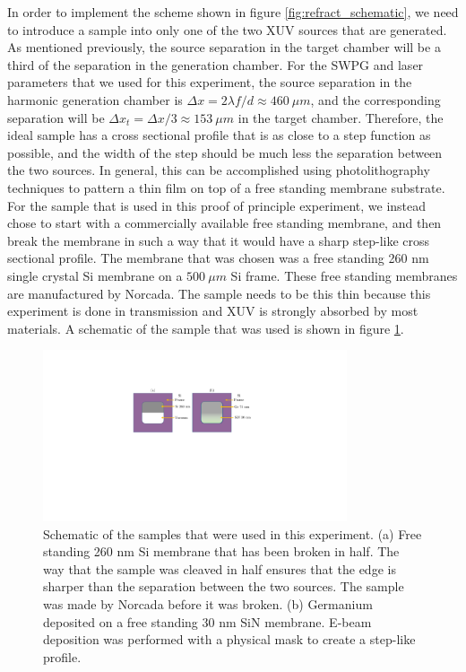 In order to implement the scheme shown in figure \ref{fig:refract_schematic}, we need to introduce a sample into only one of the two XUV sources that are generated.  As mentioned previously, the source separation in the target chamber will be a third of the separation in the generation chamber. For the SWPG and laser parameters that we used for this experiment, the source separation in the harmonic generation chamber is $\Delta x=2\lambda f/d\approx460\:\mu m$, and the corresponding separation will be $\Delta x_t = \Delta x/3\approx153\: \mu m$ in the target chamber.  Therefore, the ideal sample has a cross sectional profile that is as close to a step function as possible, and the width of the step should be much less the separation between the two sources.  In general, this can be accomplished using photolithography techniques to pattern a thin film on top of a free standing membrane substrate.  For the sample that is used in this proof of principle experiment, we instead chose to start with a commercially available free standing membrane, and then break the membrane in such a way that it would have a sharp step-like cross sectional profile.  The membrane that was chosen was a free standing 260 nm single crystal Si membrane on a $500\:\mu m$ Si frame.  These free standing membranes are manufactured by Norcada.  The sample needs to be this thin because this experiment is done in transmission and XUV is strongly absorbed by most materials. A schematic of the sample that was used is shown in figure \ref{fig:split_sample}.
\begin{figure}
	\centering
	\includegraphics[width=0.8\textwidth]{figures/refractive_index/samples.pdf}
	\caption[Schematic of the samples used to measure the refractive index of silicon and germanium]{Schematic of the samples that were used in this experiment.  (a) Free standing 260 nm Si membrane that has been broken in half.  The way that the sample was cleaved in half ensures that the edge is sharper than the separation between the two sources.  The sample was made by Norcada before it was broken. (b) Germanium deposited on a free standing 30 nm SiN membrane.  E-beam deposition was performed with a physical mask to create a step-like profile.}
	\label{fig:split_sample}
\end{figure}

